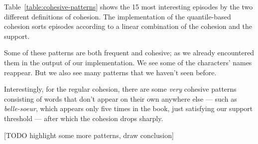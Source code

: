 Table~\ref{table:cohesive-patterns} shows the 15 most interesting episodes by the two different definitions of cohesion. The implementation of the quantile-based cohesion sorts episodes according to a linear combination of the cohesion and the support.

Some of these patterns are both frequent and cohesive; as we already encountered them in the output of our implementation. We see some of the characters' names reappear. But we also see many patterns that we haven't seen before.

Interestingly, for the regular cohesion, there are some \emph{very} cohesive patterns consisting of words that don't appear on their own anywhere else --- such as \emph{belle-soeur}, which appears only five times in the book, just satisfying our support threshold --- after which the cohesion drops sharply.

[TODO highlight some more patterns, draw conclusion]
